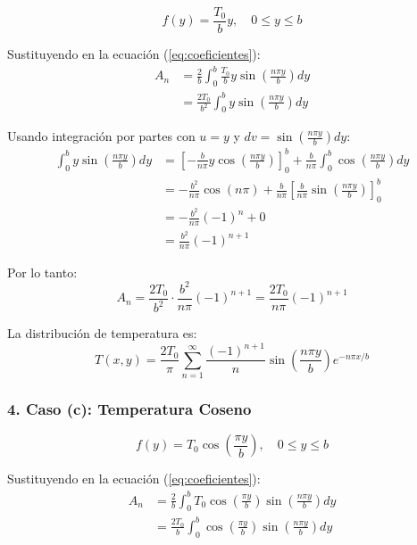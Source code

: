 \documentclass[a4paper]{article}
\begin{document}
\begin{equation}
f(y) = \frac{T_0}{b} y, \quad 0 \leq y \leq b
\end{equation}

Sustituyendo en la ecuación (\ref{eq:coeficientes}):
\begin{align}
A_n &= \frac{2}{b} \int_0^b \frac{T_0}{b} y \sin\left(\frac{n\pi y}{b}\right) dy \\
&= \frac{2T_0}{b^2} \int_0^b y \sin\left(\frac{n\pi y}{b}\right) dy
\end{align}

Usando integración por partes con $u = y$ y $dv = \sin\left(\frac{n\pi y}{b}\right) dy$:
\begin{align}
\int_0^b y \sin\left(\frac{n\pi y}{b}\right) dy &= \left[ -\frac{b}{n\pi} y \cos\left(\frac{n\pi y}{b}\right) \right]_0^b + \frac{b}{n\pi} \int_0^b \cos\left(\frac{n\pi y}{b}\right) dy \\
&= -\frac{b^2}{n\pi} \cos(n\pi) + \frac{b}{n\pi} \left[ \frac{b}{n\pi} \sin\left(\frac{n\pi y}{b}\right) \right]_0^b \\
&= -\frac{b^2}{n\pi} (-1)^n + 0 \\
&= \frac{b^2}{n\pi} (-1)^{n+1}
\end{align}

Por lo tanto:
\begin{equation}
A_n = \frac{2T_0}{b^2} \cdot \frac{b^2}{n\pi} (-1)^{n+1} = \frac{2T_0}{n\pi} (-1)^{n+1}
\end{equation}

La distribución de temperatura es:
\begin{equation}
\boxed{T(x, y) = \frac{2T_0}{\pi} \sum_{n=1}^{\infty} \frac{(-1)^{n+1}}{n} \sin\left(\frac{n\pi y}{b}\right) e^{-n\pi x/b}}
\end{equation}

\subsubsection{4. Caso (c): Temperatura Coseno}

\begin{equation}
f(y) = T_0 \cos\left(\frac{\pi y}{b}\right), \quad 0 \leq y \leq b
\end{equation}

Sustituyendo en la ecuación (\ref{eq:coeficientes}):
\begin{align}
A_n &= \frac{2}{b} \int_0^b T_0 \cos\left(\frac{\pi y}{b}\right) \sin\left(\frac{n\pi y}{b}\right) dy \\
&= \frac{2T_0}{b} \int_0^b \cos\left(\frac{\pi y}{b}\right) \sin\left(\frac{n\pi y}{b}\right) dy
\end{align}
\end{document}
